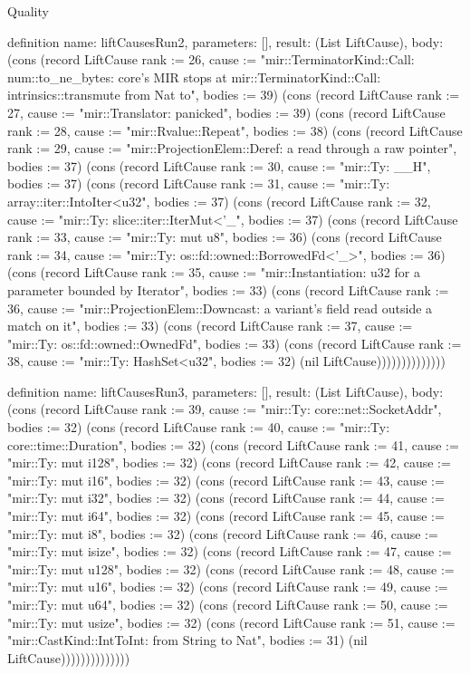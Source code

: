 \begin{lexlean}{Quality}
\begin{semanticmodule}
definition{
  name: liftCausesRun2,
  parameters: [],
  result: (List LiftCause),
  body: (cons (record LiftCause {rank := 26, cause := "mir::TerminatorKind::Call: num::to_ne_bytes: core's MIR stops at mir::TerminatorKind::Call: intrinsics::transmute from Nat to", bodies := 39}) (cons (record LiftCause {rank := 27, cause := "mir::Translator: panicked", bodies := 39}) (cons (record LiftCause {rank := 28, cause := "mir::Rvalue::Repeat", bodies := 38}) (cons (record LiftCause {rank := 29, cause := "mir::ProjectionElem::Deref: a read through a raw pointer", bodies := 37}) (cons (record LiftCause {rank := 30, cause := "mir::Ty: __H", bodies := 37}) (cons (record LiftCause {rank := 31, cause := "mir::Ty: array::iter::IntoIter<u32", bodies := 37}) (cons (record LiftCause {rank := 32, cause := "mir::Ty: slice::iter::IterMut<'_", bodies := 37}) (cons (record LiftCause {rank := 33, cause := "mir::Ty: mut u8", bodies := 36}) (cons (record LiftCause {rank := 34, cause := "mir::Ty: os::fd::owned::BorrowedFd<'_>", bodies := 36}) (cons (record LiftCause {rank := 35, cause := "mir::Instantiation: u32 for a parameter bounded by Iterator", bodies := 33}) (cons (record LiftCause {rank := 36, cause := "mir::ProjectionElem::Downcast: a variant's field read outside a match on it", bodies := 33}) (cons (record LiftCause {rank := 37, cause := "mir::Ty: os::fd::owned::OwnedFd", bodies := 33}) (cons (record LiftCause {rank := 38, cause := "mir::Ty: HashSet<u32", bodies := 32}) (nil LiftCause))))))))))))))
}

definition{
  name: liftCausesRun3,
  parameters: [],
  result: (List LiftCause),
  body: (cons (record LiftCause {rank := 39, cause := "mir::Ty: core::net::SocketAddr", bodies := 32}) (cons (record LiftCause {rank := 40, cause := "mir::Ty: core::time::Duration", bodies := 32}) (cons (record LiftCause {rank := 41, cause := "mir::Ty: mut i128", bodies := 32}) (cons (record LiftCause {rank := 42, cause := "mir::Ty: mut i16", bodies := 32}) (cons (record LiftCause {rank := 43, cause := "mir::Ty: mut i32", bodies := 32}) (cons (record LiftCause {rank := 44, cause := "mir::Ty: mut i64", bodies := 32}) (cons (record LiftCause {rank := 45, cause := "mir::Ty: mut i8", bodies := 32}) (cons (record LiftCause {rank := 46, cause := "mir::Ty: mut isize", bodies := 32}) (cons (record LiftCause {rank := 47, cause := "mir::Ty: mut u128", bodies := 32}) (cons (record LiftCause {rank := 48, cause := "mir::Ty: mut u16", bodies := 32}) (cons (record LiftCause {rank := 49, cause := "mir::Ty: mut u64", bodies := 32}) (cons (record LiftCause {rank := 50, cause := "mir::Ty: mut usize", bodies := 32}) (cons (record LiftCause {rank := 51, cause := "mir::CastKind::IntToInt: from String to Nat", bodies := 31}) (nil LiftCause))))))))))))))
}


\end{semanticmodule}
\end{lexlean}
